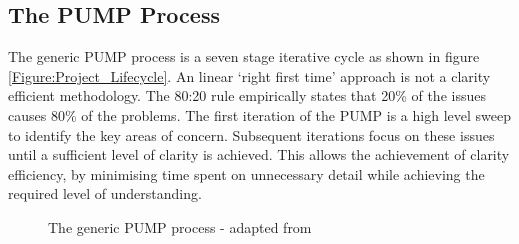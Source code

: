 \subsection{The PUMP Process}

The generic PUMP process is a seven stage iterative cycle as shown in figure \ref{Figure:Project_Lifecycle}. 
An linear `right first time' approach is not a clarity efficient methodology.
The 80:20 rule empirically states that 20\% of the issues causes 80\% of the problems. 
The first iteration of the PUMP is a high level sweep to identify the key areas of concern.
Subsequent iterations focus on these issues until a sufficient level of clarity is achieved.
This allows the achievement of clarity efficiency, by minimising time spent on unnecessary detail while achieving the required level of understanding.

\begin{figure}[!h]
  \centering
{} \quad
{}
\caption{The generic PUMP process - adapted from \cite{chapman}}
\label{Figure:GenericPUMP_Both}
\end{figure}

